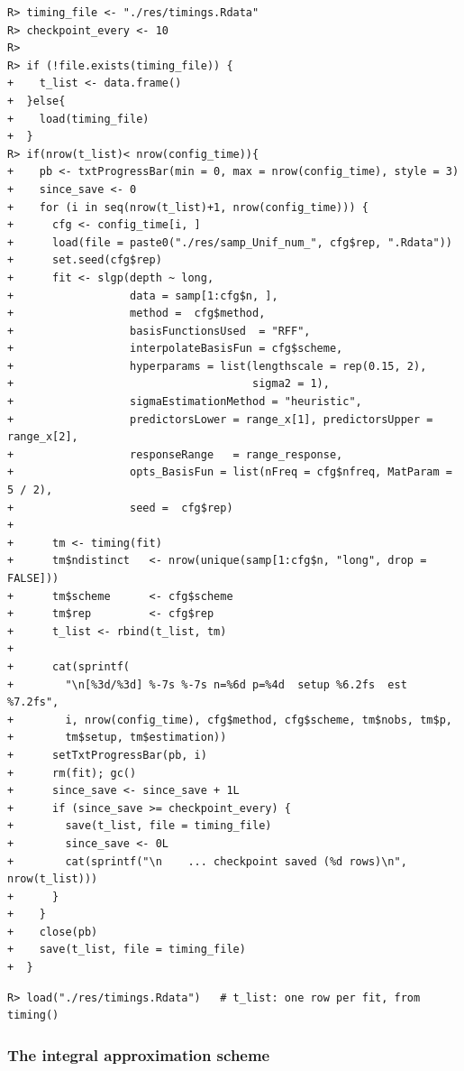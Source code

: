 \documentclass[
]{article}
\begin{document}
\begin{verbatim}
R> timing_file <- "./res/timings.Rdata"
R> checkpoint_every <- 10
R> 
R> if (!file.exists(timing_file)) {
+    t_list <- data.frame()
+  }else{
+    load(timing_file)
+  }
R> if(nrow(t_list)< nrow(config_time)){
+    pb <- txtProgressBar(min = 0, max = nrow(config_time), style = 3)
+    since_save <- 0
+    for (i in seq(nrow(t_list)+1, nrow(config_time))) {
+      cfg <- config_time[i, ]
+      load(file = paste0("./res/samp_Unif_num_", cfg$rep, ".Rdata"))
+      set.seed(cfg$rep)
+      fit <- slgp(depth ~ long,
+                  data = samp[1:cfg$n, ],
+                  method =  cfg$method,
+                  basisFunctionsUsed  = "RFF",
+                  interpolateBasisFun = cfg$scheme,
+                  hyperparams = list(lengthscale = rep(0.15, 2),
+                                     sigma2 = 1),
+                  sigmaEstimationMethod = "heuristic",
+                  predictorsLower = range_x[1], predictorsUpper = range_x[2],
+                  responseRange   = range_response,
+                  opts_BasisFun = list(nFreq = cfg$nfreq, MatParam = 5 / 2),
+                  seed =  cfg$rep)
+      
+      tm <- timing(fit)
+      tm$ndistinct   <- nrow(unique(samp[1:cfg$n, "long", drop = FALSE]))
+      tm$scheme      <- cfg$scheme
+      tm$rep         <- cfg$rep
+      t_list <- rbind(t_list, tm)
+      
+      cat(sprintf(
+        "\n[%3d/%3d] %-7s %-7s n=%6d p=%4d  setup %6.2fs  est %7.2fs",
+        i, nrow(config_time), cfg$method, cfg$scheme, tm$nobs, tm$p,
+        tm$setup, tm$estimation))
+      setTxtProgressBar(pb, i)
+      rm(fit); gc()
+      since_save <- since_save + 1L
+      if (since_save >= checkpoint_every) {
+        save(t_list, file = timing_file)
+        since_save <- 0L
+        cat(sprintf("\n    ... checkpoint saved (%d rows)\n", nrow(t_list)))
+      }
+    }
+    close(pb)
+    save(t_list, file = timing_file)
+  } 
\end{verbatim}

\begin{verbatim}
R> load("./res/timings.Rdata")   # t_list: one row per fit, from timing()
\end{verbatim}

\subsubsection{The integral approximation scheme}\label{the-integral-approximation-scheme}
\end{document}
